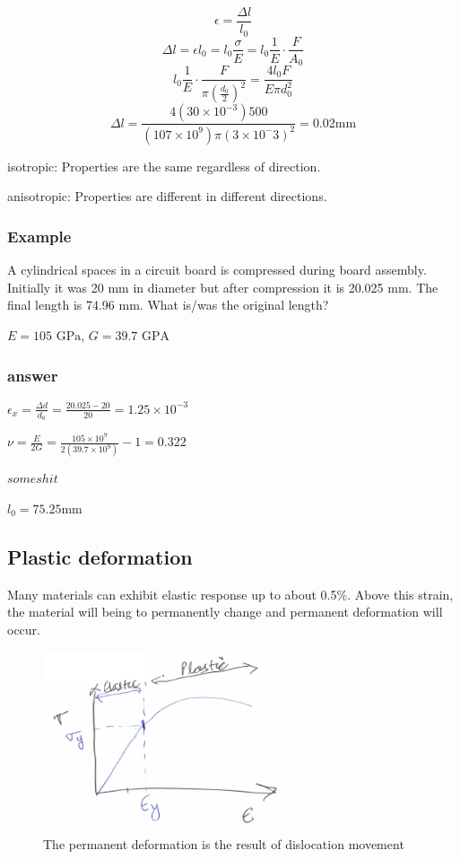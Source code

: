 \documentclass{article}
\begin{document}
\[\epsilon = \frac{\Delta l}{l_0}\]
\[\Delta l = \epsilon l_0 = l_0 \frac{\sigma}{E} = l_0\frac{1}{E} \cdot \frac{F}{A_0}\]
\[l_0\frac{1}{E} \cdot \frac{F}{\pi (\frac{d_0}{2})^2} = \frac{4l_0 F}{E\pi d_0^2}\]
\[\Delta l = \frac{4(30 \times 10^{-3})500}{(107\times 10^9)\pi (3\times10^-3)^2} = 0.02 \si{\mm}\]

isotropic: Properties are the same regardless of direction.

anisotropic: Properties are different in different directions.

\subsubsection{Example}

A cylindrical spaces in a circuit board is compressed during board assembly. Initially it was 20 mm in diameter but after compression it is 20.025 mm. The final length is 74.96 mm. What is/was the original length?

$E = 105 \text{ GPa}$, $G = 39.7\text{ GPA}$

\subsubsection*{answer}

$\epsilon_x = \frac{\Delta d}{d_0} = \frac{20.025 - 20}{20} = 1.25 \times 10^{-3}$

$\nu = \frac{E}{2G} = \frac{105 \times 10^9}{2(39.7 \times 10^9)} -1 = 0.322$

$some shit$

$l_0 = 75.25\si{\milli\metre}$

\subsection{Plastic deformation}

Many materials can exhibit elastic response up to about 0.5\%. Above this strain, the material will being to permanently change and permanent deformation will occur.

\begin{figure}[H]
	\centering
	\includegraphics[width=0.66\textwidth]{assets/8cadff62.png}
	\caption{The permanent deformation is the result of dislocation movement}
\end{figure}
\end{document}
